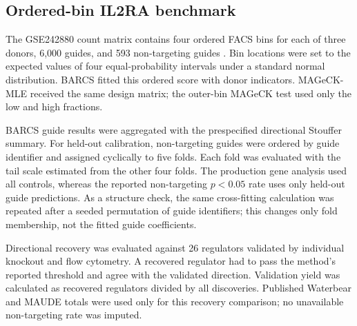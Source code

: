 \subsection{Ordered-bin IL2RA benchmark}

The GSE242880 count matrix contains four ordered FACS bins for each of three
donors, 6,000 guides, and 593 non-targeting guides
\citep{freimer2022il2ra,pimentel2024waterbear}.  Bin locations were set to the
expected values of four equal-probability intervals under a standard normal
distribution.  BARCS fitted this ordered score with donor indicators.
MAGeCK-MLE received the same design matrix; the outer-bin MAGeCK test used only
the low and high fractions.

BARCS guide results were aggregated with the prespecified directional Stouffer
summary.  For held-out calibration, non-targeting guides were ordered by guide
identifier and assigned cyclically to five folds.  Each fold was evaluated
with the tail scale estimated from the other four folds.  The production gene
analysis used all controls, whereas the reported non-targeting $p<0.05$ rate
uses only held-out guide predictions.  As a structure check, the same
cross-fitting calculation was repeated after a seeded permutation of guide
identifiers; this changes only fold membership, not the fitted guide
coefficients.

Directional recovery was evaluated against 26 regulators validated by
individual knockout and flow cytometry.  A recovered regulator had to pass the
method's reported threshold and agree with the validated direction.  Validation
yield was calculated as recovered regulators divided by all discoveries.
Published Waterbear and MAUDE totals were used only for this recovery
comparison; no unavailable non-targeting rate was imputed.
